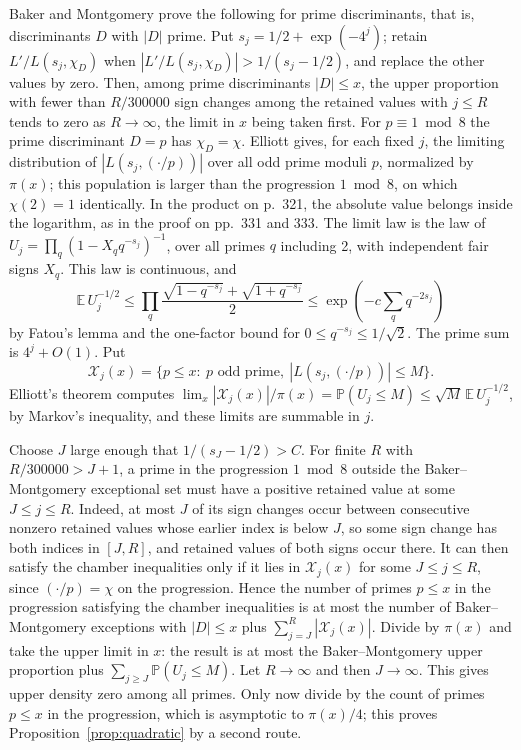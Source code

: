 \documentclass[11pt,reqno]{amsart}
\newcommand{\PP}{\mathbb P}
\newcommand{\EE}{\mathbb E}
\begin{document}
Baker and Montgomery \cite[pp.~23--24]{BM} prove the following for prime discriminants, that is, discriminants \(D\) with \(|D|\) prime. Put \(s_j=1/2+\exp(-4^j)\); retain \(L'/L(s_j,\chi_D)\) when \(|L'/L(s_j,\chi_D)|>1/(s_j-1/2)\), and replace the other values by zero. Then, among prime discriminants \(|D|\le x\), the upper proportion with fewer than \(R/300000\) sign changes among the retained values with \(j\le R\) tends to zero as \(R\to\infty\), the limit in \(x\) being taken first. For \(p\equiv1\bmod8\) the prime discriminant \(D=p\) has \(\chi_D=\chi\). Elliott \cite[Theorem~1 and pp.~331, 333]{Elliott} gives, for each fixed \(j\), the limiting distribution of \(|L(s_j,(\cdot/p))|\) over all odd prime moduli \(p\), normalized by \(\pi(x)\); this population is larger than the progression \(1\bmod8\), on which \(\chi(2)=1\) identically. In the product on p.~321, the absolute value belongs inside the logarithm, as in the proof on pp.~331 and 333. The limit law is the law of \(U_j=\prod_q(1-X_q q^{-s_j})^{-1}\), over all primes \(q\) including 2, with independent fair signs \(X_q\). This law is continuous, and
\[
 \EE\,U_j^{-1/2}
 \le \prod_q\frac{\sqrt{1-q^{-s_j}}+\sqrt{1+q^{-s_j}}}{2}
 \le \exp\!\left(-c\sum_q q^{-2s_j}\right)
\]
by Fatou's lemma and the one-factor bound for \(0\le q^{-s_j}\le 1/\sqrt2\). The prime sum is \(4^j+O(1)\). Put
\[
 \mathcal{X}_j(x)=\{p\le x:\ p\text{ odd prime},\ |L(s_j,(\cdot/p))|\le M\}.
\]
Elliott's theorem computes \(\lim_x|\mathcal{X}_j(x)|/\pi(x)=\PP(U_j\le M)\le\sqrt M\,\EE\,U_j^{-1/2}\), by Markov's inequality, and these limits are summable in \(j\).

Choose \(J\) large enough that \(1/(s_J-1/2)>C\). For finite \(R\) with \(R/300000>J+1\), a prime in the progression \(1\bmod8\) outside the Baker--Montgomery exceptional set must have a positive retained value at some \(J\le j\le R\). Indeed, at most \(J\) of its sign changes occur between consecutive nonzero retained values whose earlier index is below \(J\), so some sign change has both indices in \([J,R]\), and retained values of both signs occur there. It can then satisfy the chamber inequalities only if it lies in \(\mathcal{X}_j(x)\) for some \(J\le j\le R\), since \((\cdot/p)=\chi\) on the progression. Hence the number of primes \(p\le x\) in the progression satisfying the chamber inequalities is at most the number of Baker--Montgomery exceptions with \(|D|\le x\) plus \(\sum_{j=J}^R|\mathcal{X}_j(x)|\). Divide by \(\pi(x)\) and take the upper limit in \(x\): the result is at most the Baker--Montgomery upper proportion plus \(\sum_{j\ge J}\PP(U_j\le M)\). Let \(R\to\infty\) and then \(J\to\infty\). This gives upper density zero among all primes. Only now divide by the count of primes \(p\le x\) in the progression, which is asymptotic to \(\pi(x)/4\); this proves Proposition~\ref{prop:quadratic} by a second route.
\end{document}
